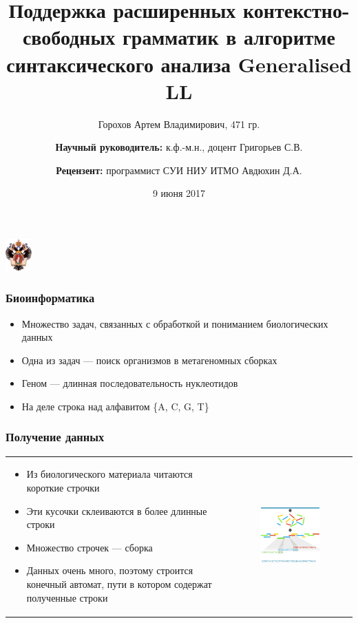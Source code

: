 \documentclass{beamer}
\title[]{Поддержка расширенных контекстно-свободных грамматик в алгоритме синтаксического анализа Generalised LL}
\institute[СПбГУ]{ Санкт-Петербургский Государственный Университет }
\author[Горохов Артем]{Горохов Артем Владимирович, 471 гр. \\
    \and  
    {\bfseries Научный руководитель:} к.ф.-м.н., доцент Григорьев С.В. \\ 
    \and  
    {\bfseries Рецензент:} \small{программист СУИ НИУ ИТМО } Авдюхин Д.А. \\ 
}
\date{9 июня 2017}
\begin{document}
 

\begin{frame}
	\begin{center} 
		{\includegraphics[width=1cm]{pictures/SPbGU_Logo.png}} 
	\end{center}
	\titlepage
\end{frame}



\begin{frame}
     \frametitle{Биоинформатика}
     \begin{itemize}
         \item Множество задач, связанных с обработкой и пониманием биологических данных
         \item Одна из задач --- поиск организмов в метагеномных сборках
         \item Геном --- длинная последовательность нуклеотидов
         \item На деле строка над алфавитом \{A, C, G, T\}
     \end{itemize}
 \end{frame}
 
 \begin{frame}
     \frametitle{Получение данных}
     \begin{tabular}{p{5cm} p{7cm}}
         \begin{itemize}
             \item Из биологического материала читаются короткие строчки
             \item Эти кусочки склеиваются в более длинные строки
             \item Множество строчек --- сборка
             \item Данных очень много, поэтому строится конечный автомат, пути в котором содержат полученные строки
         \end{itemize}
         &
         \begin{figure}[b]
             \centering
             \includegraphics[width=6.5cm]{pictures/readsAssembly.png}  
         \end{figure}
     \end{tabular}
 \end{frame}
 
\end{document}
